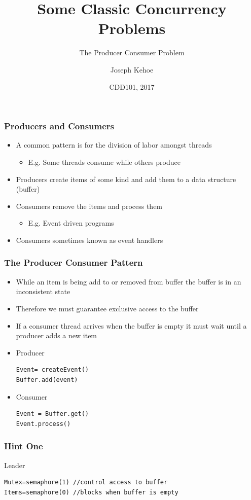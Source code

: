 \documentclass{beamer}
\title[Concurrency] %
{Some Classic Concurrency Problems}
\subtitle{The Producer Consumer Problem}
\author[Dr. Joseph Kehoe] %
{Joseph Kehoe\inst{1}}
\institute[IT Carlow] %
{
	\inst{1}%
	Department of Computing and Networking\\
	Institute of Technology Carlow
}
\date[ITC 2017] %
{CDD101, 2017}
\begin{document}
 
\frame{\titlepage}
 
 

\begin{frame}
\frametitle{Producers and Consumers}
\begin{itemize}
\item A common pattern is for the division of labor amongst threads
	\begin{itemize}
	\item E.g. Some threads consume while others produce
	\end{itemize}
\item Producers create items of some kind and add them to a data structure (buffer)
\item Consumers remove the items and process them
	\begin{itemize}
	\item E.g. Event driven programs
	\end{itemize}
\item Consumers sometimes known as event handlers
\end{itemize}
\end{frame}


\begin{frame}[fragile]
\frametitle{The Producer Consumer Pattern}
\begin{itemize}
\item While an item is being add to or removed from buffer the buffer is in an inconsistent state
\item Therefore we must guarantee exclusive access to the buffer
\item If a consumer thread arrives when the buffer is empty it must wait until a producer adds a new item
\item Producer
\begin{verbatim}
Event= createEvent()
Buffer.add(event)
\end{verbatim}
\item Consumer
\begin{verbatim}
Event = Buffer.get()
Event.process()
\end{verbatim}
\end{itemize}
\end{frame}


\begin{frame}[fragile]
	\frametitle{Hint One}
	Leader
	\begin{verbatim}
Mutex=semaphore(1) //control access to buffer
Items=semaphore(0) //blocks when buffer is empty
\end{verbatim}
\end{frame}
\end{document}
